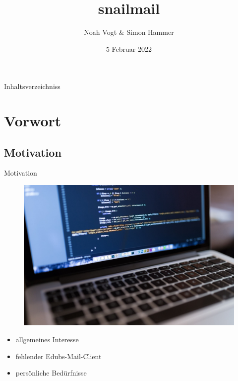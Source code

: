 \documentclass[aspectratio=169]{beamer}
\title{snailmail}
\author{Noah Vogt \& Simon Hammer}
\date{5 Februar 2022}
\institute{Gymnasium Kirschgarten}
\newlength\myheight
\newlength\mydepth
\newcommand*\inlinegraphics[1]{
    \settototalheight\myheight{Xygp}
    \settodepth\mydepth{Xygp}
    \raisebox{-\mydepth}{\texttt{[image: \#1]}}%
}
\begin{document}
\begin{frame}[plain]

\maketitle

\end{frame}

\begin{frame}[plain]{Inhaltsverzeichniss}
    \tableofcontents
\end{frame}

\section{Vorwort}
\subsection{Motivation}
\begin{frame}[plain]{Motivation}
\begin{varwidth}{.5\textwidth}
        \begin{figure}
            \centering
            \includegraphics[width=.9\textwidth]{media/macbook.jpg}
        \end{figure}
    \end{varwidth}
    \hfill
    \begin{varwidth}{.5\textwidth}
        \begin{itemize}\pause
            \item allgemeines Interesse\pause
            \item fehlender Edubs-Mail-Client\pause
            \item persönliche Bedürfnisse
        \end{itemize}
    \end{varwidth} 
\end{frame}
\end{document}
